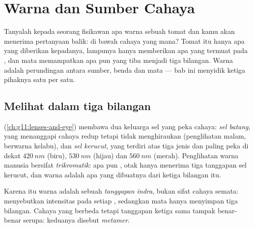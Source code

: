 \chapter{Warna dan Sumber Cahaya}\label{ch:g11:color-light-sources}

Tanyalah kepada seorang fisikawan apa warna sebuah tomat dan kamu akan
menerima pertanyaan balik: di bawah cahaya yang mana? Tomat itu hanya
 apa yang diberikan kepadanya, lampunya hanya memberikan
apa yang termuat pada , dan mata memampatkan apa pun yang
tiba menjadi tiga bilangan. Warna adalah perundingan antara sumber,
benda dan mata --- bab ini menyidik ketiga pihaknya satu per satu.

\section{Melihat dalam tiga bilangan}

\begin{definition}\label{def:g11:color-light-sources:cones}
 (\cref{ch:g11:lenses-and-eye}) membawa dua keluarga sel yang peka
cahaya: \emph{sel batang}, yang menanggapi cahaya
redup tetapi tidak menghiraukan  (penglihatan malam,
berwarna kelabu), dan \emph{sel kerucut}, yang
terdiri atas tiga jenis dan paling peka di dekat $\qty{420}{nm}$
(biru), $\qty{530}{nm}$ (hijau) dan $\qty{560}{nm}$ (merah).
Penglihatan warna manusia bersifat
\emph{trikromatik}: apa pun ,
otak hanya menerima tiga tanggapan sel kerucut, dan warna adalah apa
yang dibuatnya dari ketiga bilangan itu.
\end{definition}

\begin{definition}\label{def:g11:color-light-sources:perception}
Karena itu warna adalah sebuah \emph{tanggapan indra}, bukan sifat
cahaya semata:  menyebutkan intensitas pada setiap , sedangkan mata hanya menyimpan tiga bilangan. Cahaya yang
 berbeda tetapi tanggapan ketiga  sama tampak
benar-benar serupa: keduanya disebut \emph{metamer}.
\end{definition}

